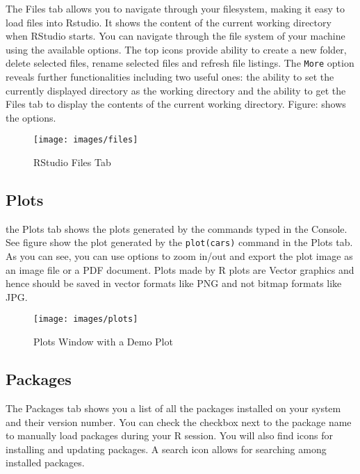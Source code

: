 \documentclass[
]{krantz}
\begin{document}
The Files tab allows you to navigate through your filesystem, making it easy to load files into Rstudio. It shows the content of the current working directory when RStudio starts. You can navigate through the file system of your machine using the available options. The top icons provide ability to create a new folder, delete selected files, rename selected files and refresh file listings. The \texttt{More} option reveals further functionalities including two useful ones: the ability to set the currently displayed directory as the working directory and the ability to get the Files tab to display the contents of the current working directory. Figure: shows the options.

\begin{figure}

{\centering \texttt{[image: images/files]} 

}

\caption{RStudio Files Tab}\label{fig:unnamed-chunk-6}
\end{figure}

\hypertarget{plots}{%
\subsection{Plots}\label{plots}}

the Plots tab shows the plots generated by the commands typed in the Console. See figure show the plot generated by the \texttt{plot(cars)} command in the Plots tab. As you can see, you can use options to zoom in/out and export the plot image as an image file or a PDF document. Plots made by R plots are Vector graphics and hence should be saved in vector formats like PNG and not bitmap formats like JPG.

\begin{figure}

{\centering \texttt{[image: images/plots]} 

}

\caption{Plots Window with a Demo Plot}\label{fig:unnamed-chunk-7}
\end{figure}

\hypertarget{packages}{%
\subsection{Packages}\label{packages}}

The Packages tab shows you a list of all the packages installed on your system and their version number. You can check the checkbox next to the package name to manually load packages during your R session. You will also find icons for installing and updating packages. A search icon allows for searching among installed packages.
\end{document}
